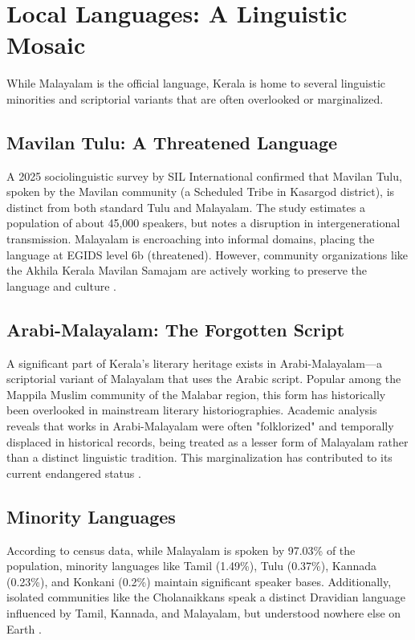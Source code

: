 \documentclass[12pt]{article}
\begin{document}
\section{Local Languages: A Linguistic Mosaic}
While Malayalam is the official language, Kerala is home to several linguistic minorities and scriptorial variants that are often overlooked or marginalized.

\subsection{Mavilan Tulu: A Threatened Language}
A 2025 sociolinguistic survey by SIL International confirmed that Mavilan Tulu, spoken by the Mavilan community (a Scheduled Tribe in Kasargod district), is distinct from both standard Tulu and Malayalam. The study estimates a population of about 45,000 speakers, but notes a disruption in intergenerational transmission. Malayalam is encroaching into informal domains, placing the language at EGIDS level 6b (threatened). However, community organizations like the Akhila Kerala Mavilan Samajam are actively working to preserve the language and culture \cite{mavilan}.

\subsection{Arabi-Malayalam: The Forgotten Script}
A significant part of Kerala's literary heritage exists in Arabi-Malayalam—a scriptorial variant of Malayalam that uses the Arabic script. Popular among the Mappila Muslim community of the Malabar region, this form has historically been overlooked in mainstream literary historiographies. Academic analysis reveals that works in Arabi-Malayalam were often "folklorized" and temporally displaced in historical records, being treated as a lesser form of Malayalam rather than a distinct linguistic tradition. This marginalization has contributed to its current endangered status \cite{arabi}.

\subsection{Minority Languages}
According to census data, while Malayalam is spoken by 97.03\% of the population, minority languages like Tamil (1.49\%), Tulu (0.37\%), Kannada (0.23\%), and Konkani (0.2\%) maintain significant speaker bases. Additionally, isolated communities like the Cholanaikkans speak a distinct Dravidian language influenced by Tamil, Kannada, and Malayalam, but understood nowhere else on Earth \cite{wiki, cholanaikkans}.
\end{document}
